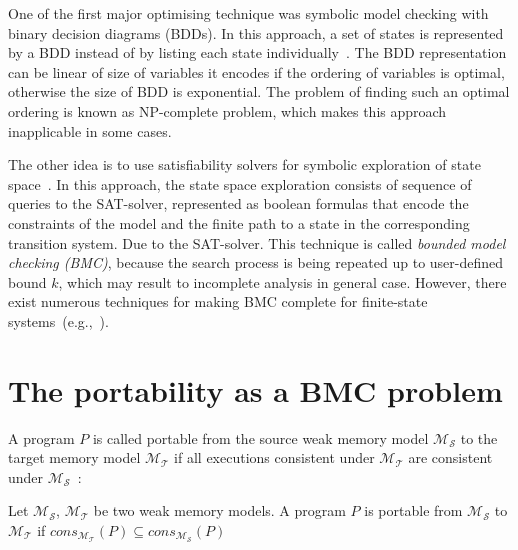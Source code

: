 One of the first major optimising technique was symbolic model checking with binary decision diagrams (BDDs). In this approach, a set of states is represented by a BDD instead of by listing each state individually~\cite{clarke2012model}.
The BDD representation can be linear of size of variables it encodes if the ordering of variables is optimal, otherwise the size of BDD is exponential. The problem of finding such an optimal ordering is known as NP-complete problem, which makes this approach inapplicable in some cases.

The other idea is to use satisfiability solvers for symbolic exploration of state space~\cite{clarke2001bounded}. In this approach, the state space exploration consists of sequence of queries to the SAT-solver, represented as boolean formulas that encode the constraints of the model and the finite path to a state in the corresponding transition system.  
Due to the SAT-solver. This technique is called \textit{bounded model checking (BMC)}, because the search process is being repeated up to user-defined bound $k$, which may result to incomplete analysis in general case. However, there exist numerous techniques for making BMC complete for finite-state systems~(e.g.,~\cite{shtrichman2000tuning}).


\section{The portability as a BMC problem}
\label{ch:port:enc}

A program $P$ is called portable from the source weak memory model $\mathcal{M_S}$ to the target memory model $\mathcal{M_T}$ if all executions consistent under $\mathcal{M_T}$ are consistent under $\mathcal{M_S}$~\cite{Porthos17}:

\begin{definition}[Portability]
Let $\mathcal{M_S}$, $\mathcal{M_T}$ be two weak memory models. A program $P$ is portable from $\mathcal{M_S}$ to $\mathcal{M_T}$ if 
$cons_{\mathcal{M_T}}(P) \subseteq cons_{\mathcal{M_S}}(P)$
\end{definition}

